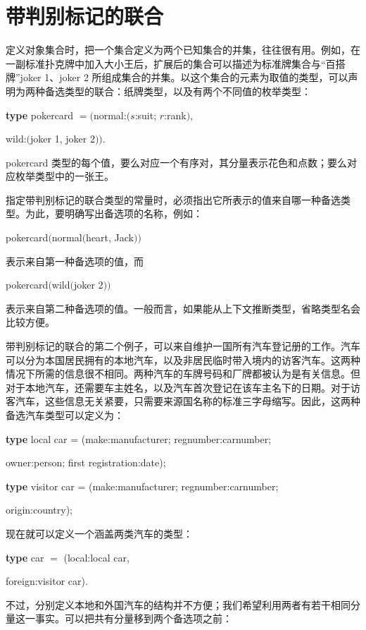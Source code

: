 \documentclass[twoside,11pt,fontset=none]{ctexbook}
\begin{document}
\section[带判别标记的联合]{带判别标记的联合}

定义对象集合时，把一个集合定义为两个已知集合的并集，往往很有用。例如，在一副标准扑克牌中加入大小王后，扩展后的集合可以描述为标准牌集合与“百搭牌”joker 1、joker 2 所组成集合的并集。以这个集合的元素为取值的类型，可以声明为两种备选类型的联合：纸牌类型，以及有两个不同值的枚举类型：

\quad \textbf{type} pokercard $= ($normal:$(s$:suit; $r$:rank$)$,

\tabto{10.2em}wild:$($joker 1, joker 2$))$.

\noindent
pokercard 类型的每个值，要么对应一个有序对，其分量表示花色和点数；要么对应枚举类型中的一张王。

指定带判别标记的联合类型的常量时，必须指出它所表示的值来自哪一种备选类型。为此，要明确写出备选项的名称，例如：

\quad pokercard$($normal$($heart, Jack$))$

\noindent
表示来自第一种备选项的值，而

\quad pokercard$($wild$($joker 2$))$

\noindent
表示来自第二种备选项的值。一般而言，如果能从上下文推断类型，省略类型名会比较方便。

带判别标记的联合的第二个例子，可以来自维护一国所有汽车登记册的工作。汽车可以分为本国居民拥有的本地汽车，以及非居民临时带入境内的访客汽车。这两种情况下所需的信息很不相同。两种汽车的车牌号码和厂牌都被认为是有关信息。但对于本地汽车，还需要车主姓名，以及汽车首次登记在该车主名下的日期。对于访客汽车，这些信息无关紧要，只需要来源国名称的标准三字母缩写。因此，这两种备选汽车类型可以定义为：

\quad \textbf{type} local car = (make:manufacturer; regnumber:carnumber;

\tabto{9.4em} owner:person; first registration:date);

\quad \textbf{type} visitor car = (make:manufacturer; regnumber:carnumber;

\tabto{10.1em} origin:country);

现在就可以定义一个涵盖两类汽车的类型：

\quad \textbf{type} car $=$ (local:local car,

\tabto{7.4em} foreign:visitor car).

\noindent
不过，分别定义本地和外国汽车的结构并不方便；我们希望利用两者有若干相同分量这一事实。可以把共有分量移到两个备选项之前：
\end{document}
